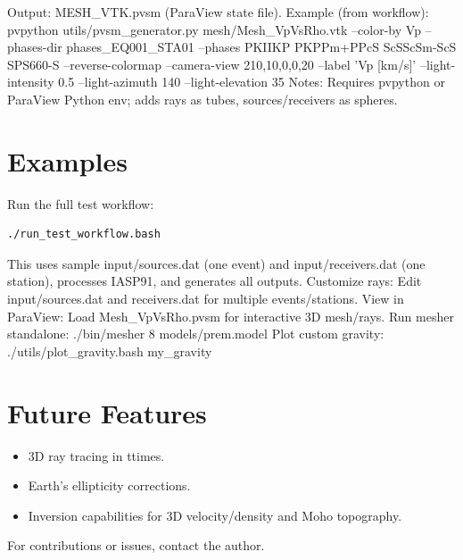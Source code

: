\documentclass[12pt,a4paper]{article}
\begin{document}
Output: MESH\_VTK.pvsm (ParaView state file).
Example (from workflow): pvpython utils/pvsm\_generator.py mesh/Mesh\_VpVsRho.vtk --color-by Vp --phases-dir phases\_EQ001\_STA01 --phases PKIIKP PKPPm+PPcS ScSScSm-ScS SPS660-S --reverse-colormap --camera-view 210,10,0,0,20 --label 'Vp [km/s]' --light-intensity 0.5 --light-azimuth 140 --light-elevation 35
Notes: Requires pvpython or ParaView Python env; adds rays as tubes, sources/receivers as spheres.

\section{Examples}
Run the full test workflow:

\begin{lstlisting}[language=Bash]
./run_test_workflow.bash
\end{lstlisting}

This uses sample input/sources.dat (one event) and input/receivers.dat (one station), processes IASP91, and generates all outputs.
Customize rays: Edit input/sources.dat and receivers.dat for multiple events/stations.
View in ParaView: Load Mesh\_VpVsRho.pvsm for interactive 3D mesh/rays.
Run mesher standalone: ./bin/mesher 8 models/prem.model
Plot custom gravity: ./utils/plot\_gravity.bash my\_gravity

\section{Future Features}
\begin{itemize}
    \item 3D ray tracing in ttimes.
    \item Earth's ellipticity corrections.
    \item Inversion capabilities for 3D velocity/density and Moho topography.
\end{itemize}

For contributions or issues, contact the author.
\end{document}
